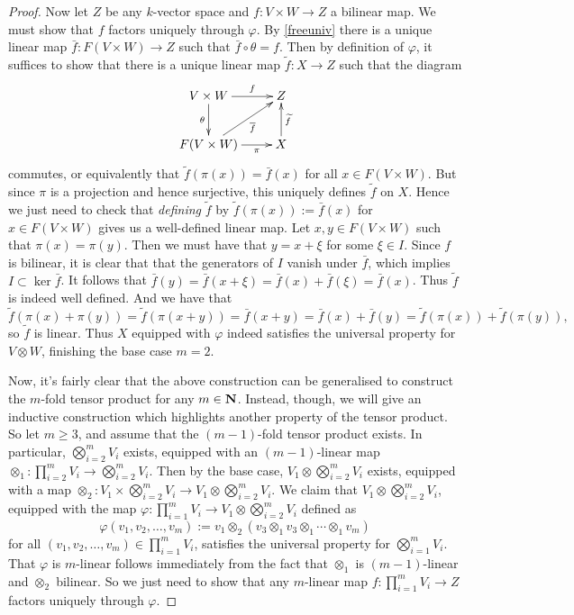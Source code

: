 \begin{pro}
\begin{proof}
    Now let $Z$ be any $k$-vector space and $f: V \times W \to Z$ a
    bilinear map. We must show that $f$ factors uniquely through
    $\varphi$. By \ref{freeuniv} there is a unique linear map $\bar f:
    F(V \times W) \to Z$ such that $\bar f \circ \theta = f$. Then by
    definition of $\varphi$, it suffices to show that there is a
    unique linear map $\tilde f : X \to Z$ such that the diagram
    \[ \xymatrix{ V \times W \ar[r]^-f \ar[d]_-{\theta} & Z \\ F(V
      \times W) \ar[ur]_-{\bar f} \ar[r]_-\pi & X \ar[u]_-{\tilde f}
    }\] commutes, or equivalently that $\tilde f(\pi(x)) = \bar f(x)$
    for all $x \in F(V \times W)$. But since $\pi$ is a projection and
    hence surjective, this uniquely defines $\tilde f$ on $X$. Hence
    we just need to check that \emph{defining} $\tilde f$ by $\tilde
    f(\pi(x)) := \bar f(x)$ for $x \in F(V \times W)$ gives us a
    well-defined linear map. Let $x,y \in F(V \times W)$ such that
    $\pi(x) = \pi(y)$. Then we must have that $y = x + \xi$ for some
    $\xi \in I$. Since $f$ is bilinear, it is clear that that the
    generators of $I$ vanish under $\bar f$, which implies $I \subset
    \ker \bar f$. It follows that $\bar f(y) = \bar f(x + \xi) = \bar
    f(x) + \bar f(\xi) = \bar f(x)$. Thus $\tilde f$ is indeed well
    defined. And we have that
    \[ \tilde f(\pi(x) + \pi(y)) = \tilde f(\pi(x+y)) = \bar f(x+y) =
    \bar f(x) + \bar f(y) = \tilde f(\pi(x)) + \tilde f(\pi(y)), \] so
    $\tilde f$ is linear. Thus $X$ equipped with $\varphi$ indeed
    satisfies the universal property for $V \otimes W$, finishing the
    base case $m = 2$.

    Now, it's fairly clear that the above construction can be
    generalised to construct the $m$-fold tensor product for any $m
    \in \boldsymbol{\mathbf{N}}$. Instead, though, we will give an inductive construction
    which highlights another property of the tensor product. So let $m
    \ge 3$, and assume that the $(m-1)$-fold tensor product exists. In
    particular, $\bigotimes_{i=2}^m V_i$ exists, equipped with an
    $(m-1)$-linear map $\otimes_1 : \prod_{i=2}^m V_i \to
    \bigotimes_{i=2}^m V_i$. Then by the base case, $V_1 \otimes
    \bigotimes_{i=2}^m V_i$ exists, equipped with a map $\otimes_2 :
    V_1 \times \bigotimes_{i=2}^m V_i \to V_1 \otimes
    \bigotimes_{i=2}^m V_i$. We claim that $V_1 \otimes
    \bigotimes_{i=2}^m V_i$, equipped with the map $\varphi :
    \prod_{i=1}^m V_i \to V_1 \otimes \bigotimes_{i=2}^m V_i$ defined
    as
    \[ \varphi(v_1,v_2,\ldots,v_m) := v_1 \otimes_2 (v_3 \otimes_1 v_3
    \otimes_1 \cdots \otimes_1 v_m) \] for all $(v_1,v_2,\ldots,v_m)
    \in \prod_{i=1}^m V_i$, satisfies the universal property for
    $\bigotimes_{i=1}^m V_i$. That $\varphi$ is $m$-linear follows
    immediately from the fact that $\otimes_1$ is $(m-1)$-linear and
    $\otimes_2$ bilinear. So we just need to show that any $m$-linear
    map $f: \prod_{i=1}^m V_i \to Z$ factors uniquely through
    $\varphi$.


\end{proof}
\end{pro}

